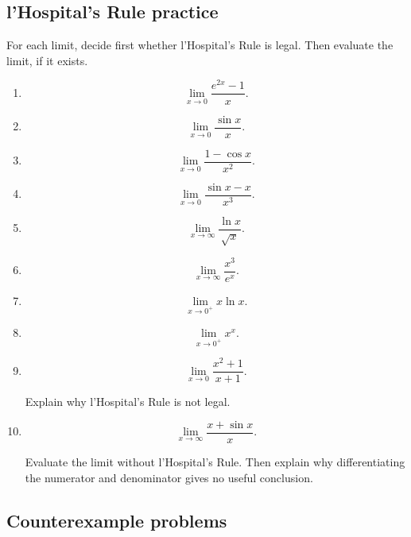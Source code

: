 \subsection{l'Hospital's Rule practice}
\label{subsec:chapter-6-lhospital-practice}

For each limit, decide first whether l'Hospital's Rule is legal.  Then evaluate the
limit, if it exists.

\begin{enumerate}
\item

\[
\lim_{x\to0}\frac{e^{2x}-1}{x}.
\]

\item

\[
\lim_{x\to0}\frac{\sin x}{x}.
\]

\item

\[
\lim_{x\to0}\frac{1-\cos x}{x^2}.
\]

\item

\[
\lim_{x\to0}\frac{\sin x-x}{x^3}.
\]

\item

\[
\lim_{x\to\infty}\frac{\ln x}{\sqrt{x}}.
\]

\item

\[
\lim_{x\to\infty}\frac{x^3}{e^x}.
\]

\item

\[
\lim_{x\to0^+}x\ln x.
\]

\item

\[
\lim_{x\to0^+}x^x.
\]

\item

\[
\lim_{x\to0}\frac{x^2+1}{x+1}.
\]

Explain why l'Hospital's Rule is not legal.

\item

\[
\lim_{x\to\infty}\frac{x+\sin x}{x}.
\]

Evaluate the limit without l'Hospital's Rule.  Then explain why differentiating the
numerator and denominator gives no useful conclusion.
\end{enumerate}

\subsection{Counterexample problems}
\label{subsec:chapter-6-counterexample-problems}

